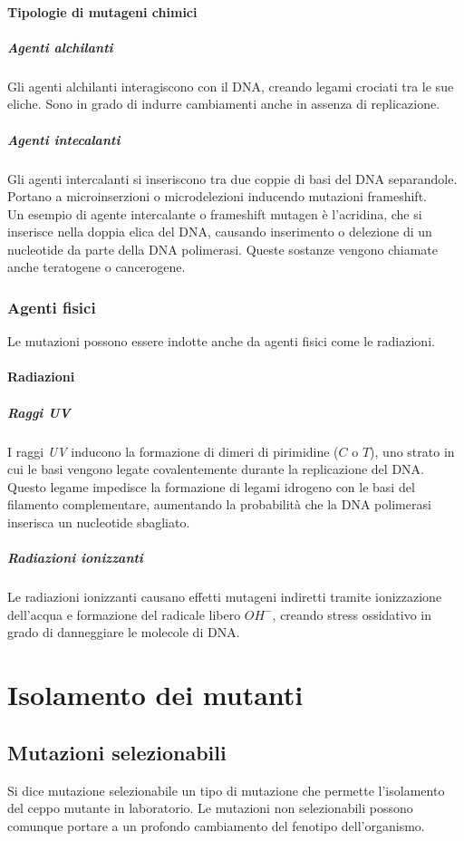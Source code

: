 			\paragraph{Tipologie di mutageni chimici}

				\subparagraph{Agenti alchilanti}
				Gli agenti alchilanti interagiscono con il DNA, creando legami crociati tra le sue eliche.
				Sono in grado di indurre cambiamenti anche in assenza di replicazione.

				\subparagraph{Agenti intecalanti}
				Gli agenti intercalanti si inseriscono tra due coppie di basi del DNA separandole.
				Portano a microinserzioni o microdelezioni inducendo mutazioni frameshift.\\
				Un esempio di agente intercalante o frameshift mutagen \`e l'acridina, che si inserisce nella doppia elica del DNA, causando inserimento o delezione di un nucleotide da parte della DNA polimerasi.
				Queste sostanze vengono chiamate anche teratogene o cancerogene.
		
		\subsubsection{Agenti fisici}
		Le mutazioni possono essere indotte anche da agenti fisici come le radiazioni.

			\paragraph{Radiazioni}

				\subparagraph{Raggi \emph{UV}}
				I raggi \emph{UV} inducono la formazione di dimeri di pirimidine ($C$ o $T$), uno strato in cui le basi vengono legate covalentemente durante la replicazione del DNA.
				Questo legame impedisce la formazione di legami idrogeno con le basi del filamento complementare, aumentando la probabilit\`a che la DNA polimerasi inserisca un nucleotide sbagliato.
				\subparagraph{Radiazioni ionizzanti}
				Le radiazioni ionizzanti causano effetti mutageni indiretti tramite ionizzazione dell'acqua e formazione del radicale libero \emph{$OH^-$}, creando stress ossidativo in grado di danneggiare le molecole di DNA.

\section{Isolamento dei mutanti}

	\subsection{Mutazioni selezionabili}
	Si dice mutazione selezionabile un tipo di mutazione che permette l'isolamento del ceppo mutante in laboratorio.
	Le mutazioni non selezionabili possono comunque portare a un profondo cambiamento del fenotipo dell'organismo.

